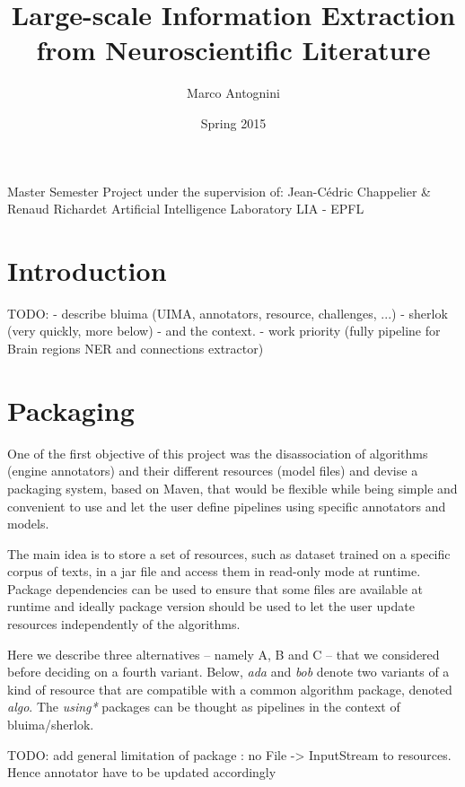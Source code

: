 \documentclass{article}
\title{Large-scale Information Extraction from Neuroscientific Literature}
\date{Spring 2015}
\author{Marco Antognini}
\newcommand{\id}[1]{\mbox{\textit{#1}}}
\begin{document}
\maketitle

Master Semester Project under the supervision of:
Jean-Cédric Chappelier \& 
Renaud Richardet
Artificial Intelligence Laboratory LIA - EPFL

\newpage
{}


\tableofcontents
\newpage

\section{Introduction}

TODO:
 - describe bluima (UIMA, annotators, resource, challenges, ...)
 - sherlok (very quickly, more below) 
 - and the context.
 - work priority (fully pipeline for Brain regions NER and connections extractor)



\section{Packaging}

One of the first objective of this project was the disassociation of algorithms (engine annotators) and their different resources (model files) and devise a packaging system, based on Maven, that would be flexible while being simple and convenient to use and let the user define pipelines using specific annotators and models.

The main idea is to store a set of resources, such as dataset trained on a specific corpus of texts, in a jar file and access them in read-only mode at runtime. Package dependencies can be used to ensure that some files are available at runtime and ideally package version should be used to let the user update resources independently of the algorithms.

Here we describe three alternatives -- namely A, B and C -- that we considered before deciding on a fourth variant. Below, \id{ada} and \id{bob} denote two variants of a kind of resource that are compatible with a common algorithm package, denoted \id{algo}. The \id{using*} packages can be thought as pipelines in the context of bluima/sherlok.

TODO: add general limitation of package : no File -> InputStream to resources. Hence annotator have to be updated accordingly
\end{document}
